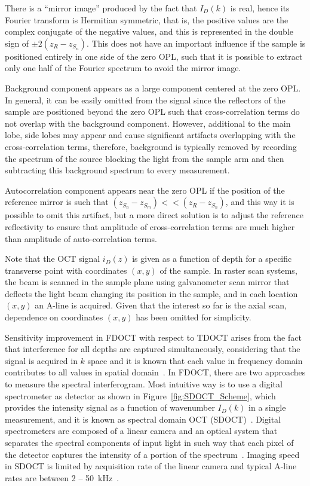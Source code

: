 There is a ``mirror image'' produced by the fact that $I_D(k)$ is real, hence its Fourier transform is Hermitian symmetric, that is, the positive values are the complex conjugate of the negative values, and this is represented in the double sign of $\pm2(z_R-z_{S_n})$. This does not have an important influence if the sample is positioned entirely in one side of the zero OPL, such that it is possible to extract only one half of the Fourier spectrum to avoid the mirror image.

Background component appears as a large component centered at the zero OPL. In general, it can be easily omitted from the signal since the reflectors of the sample are positioned beyond the zero OPL such that cross-correlation terms do not overlap with the background component. However, additional to the main lobe, side lobes may appear and cause significant artifacts overlapping with the cross-correlation terms, therefore, background is typically removed by recording the spectrum of the source blocking the light from the sample arm and then subtracting this background spectrum to every measurement.

Autocorrelation component appears near the zero OPL if the position of the reference mirror is such that $(z_{S_n}-z_{S_m}) << (z_R-z_{S_n})$, and this way it is possible to omit this artifact, but a more direct solution is to adjust the reference reflectivity to ensure that amplitude of cross-correlation terms are much higher than amplitude of auto-correlation terms.

Note that the OCT signal $i_D(z)$ is given as a function of depth for a specific transverse point with coordinates $(x,y)$ of the sample. In raster scan systems, the beam is scanned in the sample plane using galvanometer scan mirror that deflects the light beam changing its position in the sample, and in each location $(x,y)$ an A-line is acquired. Given that the interest so far is the axial scan, dependence on coordinates $(x,y)$ has been omitted for simplicity.
 
Sensitivity improvement in FDOCT with respect to TDOCT arises from the fact that interference for all depths are captured simultaneously, considering that the signal is acquired in $k$ space and it is known that each value in frequency domain contributes to all values in spatial domain~\cite{deBoer2003_Improved}. In FDOCT, there are two approaches to measure the spectral interferogram. Most intuitive way is to use a digital spectrometer as detector as shown in Figure~\ref{fig:SDOCT_Scheme}, which provides the intensity signal as a function of wavenumber $I_D(k)$ in a single measurement, and it is known as spectral domain OCT (SDOCT)~\cite{Fercher1995_Measurement}. Digital spectrometers are composed of a linear camera and an optical system that separates the spectral components of input light in such way that each pixel of the detector captures the intensity of a portion of the spectrum~\cite{Neumann2014_Fundamentals}. Imaging speed in SDOCT is limited by acquisition rate of the linear camera and typical A-line rates are between 2 -- 50~kHz~\cite{Fujimoto2015_Introduction}.

